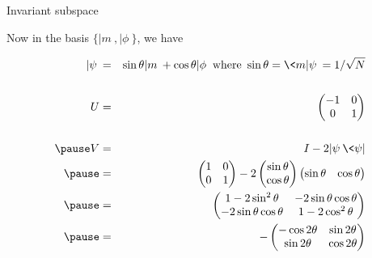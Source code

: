 \begin{frame}{Invariant subspace}

Now in the basis $\{|m\>,|\phi\>\}$, we have

\begin{eqnarray*}  
|\psi\> 
& = & 
\sin\theta |m\> + \cos\theta |\phi\> \mbox{ where } \sin\theta = \<m|\psi\> = 1/\sqrt{N} \\
&   & \\
U & = & 
\begin{pmatrix}-1 & 0 \\ 0 & 1\end{pmatrix} \\
&   & \\ \pause
V 
& = & 
I-2|\psi\>\<\psi| \\ \pause
& = &   
\begin{pmatrix} 1 & 0 \\ 0 & 1 \end{pmatrix} 
-2 
\begin{pmatrix} \sin\theta \\ \cos\theta \end{pmatrix} 
\begin{pmatrix} \sin\theta & \cos\theta\end{pmatrix} \\ \pause
& = & 
\begin{pmatrix} 
  1-2\sin^2\theta         & -2\sin\theta\cos\theta \\ 
   -2\sin\theta\cos\theta & 1-2\cos^2\theta
\end{pmatrix} \\ \pause
& = &
-
\begin{pmatrix} 
  -\cos 2\theta & \sin 2\theta \\
   \sin 2\theta & \cos 2 \theta 
\end{pmatrix} 
\end{eqnarray*}
\end{frame}




